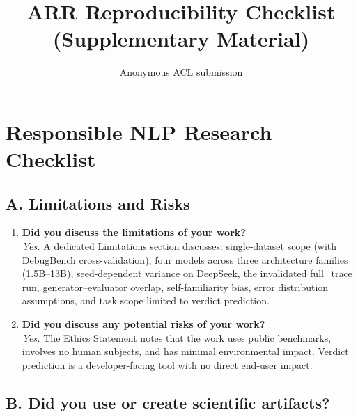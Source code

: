 \documentclass[11pt,a4paper]{article}
\title{ARR Reproducibility Checklist\\(Supplementary Material)}
\author{Anonymous ACL submission}
\begin{document}
\maketitle

\section*{Responsible NLP Research Checklist}

\subsection*{A. Limitations and Risks}

\begin{enumerate}
\item \textbf{Did you discuss the limitations of your work?} \\
\textit{Yes.} A dedicated Limitations section discusses: single-dataset scope (with DebugBench cross-validation), four models across three architecture families (1.5B--13B), seed-dependent variance on DeepSeek, the invalidated full\_trace run, generator--evaluator overlap, self-familiarity bias, error distribution assumptions, and task scope limited to verdict prediction.

\item \textbf{Did you discuss any potential risks of your work?} \\
\textit{Yes.} The Ethics Statement notes that the work uses public benchmarks, involves no human subjects, and has minimal environmental impact. Verdict prediction is a developer-facing tool with no direct end-user impact.
\end{enumerate}

\subsection*{B. Did you use or create scientific artifacts?}
\end{document}

